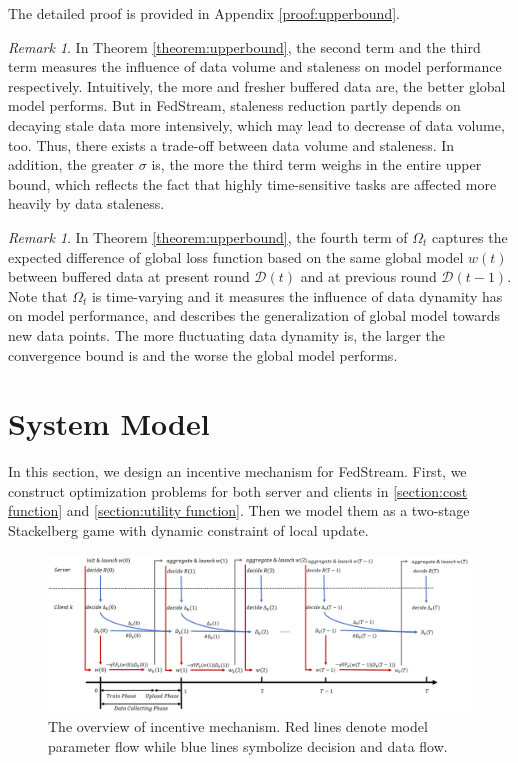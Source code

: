 \documentclass{article}
\theoremstyle{plain}
\theoremstyle{definition}
\theoremstyle{remark}
\newtheorem{remark}[theorem]{Remark}
\begin{document}
The detailed proof is provided in Appendix \ref{proof:upperbound}.
\begin{remark}
  In Theorem \ref{theorem:upperbound}, the second term and the third term measures the influence of data volume and staleness on model performance respectively. Intuitively, the more and fresher buffered data are, the better global model performs.
  But in FedStream, staleness reduction partly depends on decaying stale data more intensively, which may lead to decrease of data volume, too. Thus, there exists a trade-off between data volume and staleness.
  In addition, the greater $\sigma$ is, the more the third term weighs in the entire upper bound, which reflects the fact that highly time-sensitive tasks are affected more heavily by data staleness. 
\end{remark}
\begin{remark}
  In Theorem \ref{theorem:upperbound}, the fourth term of $\Omega_t$ captures the expected difference of global loss function based on the same global model $w(t)$ between buffered data at present round $\mathcal{D}(t)$ and at previous round $\mathcal{D}(t-1)$.
  Note that $\Omega_t$ is time-varying and it measures the influence of data dynamity has on model performance, and describes the generalization of global model towards new data points. 
  The more fluctuating data dynamity is, the larger the convergence bound is and the worse the global model performs. 
\end{remark}

\section{System Model}
\label{section:system model}
In this section, we design an incentive mechanism for FedStream.
First, we construct optimization problems for both server and clients in \ref{section:cost function} and \ref{section:utility function}.
Then we model them as a two-stage Stackelberg game with dynamic constraint of local update.
\begin{figure}[ht]
  \centering
  \includegraphics[width=\columnwidth]{figures/figure_17.png}
  \caption{The overview of incentive mechanism. Red lines denote model parameter flow while blue lines symbolize decision and data flow.}
  \label{fig:overview}
\end{figure}
\end{document}
